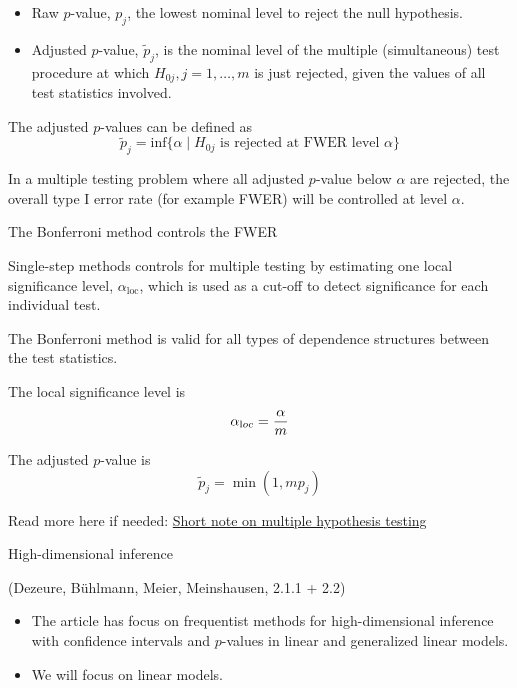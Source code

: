 \documentclass[
  ignorenonframetext,
]{beamer}
\providecommand{\tightlist}{%
  \setlength{\itemsep}{0pt}\setlength{\parskip}{0pt}}
\begin{document}
\begin{frame}

\begin{itemize}
\tightlist
\item
  Raw \(p\)-value, \(p_j\), the lowest nominal level to reject the null
  hypothesis.\\
\item
  Adjusted \(p\)-value, \(\tilde{p}_j\), is the nominal level of the
  multiple (simultaneous) test procedure at which
  \(H_{0j}, j=1,\ldots,m\) is just rejected, given the values of all
  test statistics involved.
\end{itemize}

The adjusted \(p\)-values can be defined as
\[\tilde{p}_j = \text{inf}\{\alpha  \mid H_{0j}\text{ is rejected at FWER level } \alpha \}\]

In a multiple testing problem where all adjusted \(p\)-value below
\(\alpha\) are rejected, the overall type I error rate (for example
FWER) will be controlled at level \(\alpha\).

\end{frame}

\begin{frame}

\begin{block}{The Bonferroni method controls the FWER}

Single-step methods controls for multiple testing by estimating one
local significance level, \(\alpha_{\text{loc}}\), which is used as a
cut-off to detect significance for each individual test.

The Bonferroni method is valid for all types of dependence structures
between the test statistics.

The local significance level is \[\alpha_{\text loc}=\frac{\alpha}{m}\]

The adjusted \(p\)-value is \[ \tilde{p}_j =\min(1,m p_j)\]

Read more here if needed:
\href{https://www.math.ntnu.no/emner/TMA4267/2017v/multtest.pdf}{Short
note on multiple hypothesis testing}

\end{block}

\end{frame}

\begin{frame}

\begin{block}{High-dimensional inference}

(Dezeure, Bühlmann, Meier, Meinshausen, 2.1.1 + 2.2)

\begin{itemize}
\tightlist
\item
  The article has focus on frequentist methods for high-dimensional
  inference with confidence intervals and \(p\)-values in linear and
  generalized linear models.
\item
  We will focus on linear models.
\end{itemize}

\end{block}

\end{frame}
\end{document}
